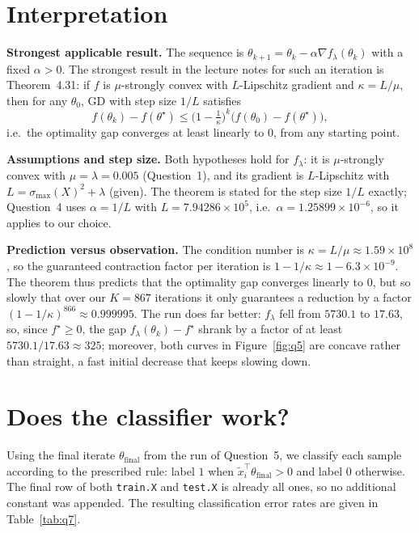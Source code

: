 \documentclass[a4paper,12pt]{article}
\newcommand{\xt}{\tilde{x}}
\begin{document}
\section{Interpretation}\label{sec:q6}
\textbf{Strongest applicable result.} The sequence is $\theta_{k+1} = \theta_k - \alpha \nabla f_\lambda(\theta_k)$ with a fixed $\alpha > 0$. The strongest result in the lecture notes for such an iteration is Theorem~4.31: if $f$ is $\mu$-strongly convex with $L$-Lipschitz gradient and $\kappa = L/\mu$, then for any $\theta_0$, GD with step size $1/L$ satisfies
\[
  f(\theta_k) - f(\theta^\star) \le \Big(1 - \tfrac{1}{\kappa}\Big)^k \big(f(\theta_0) - f(\theta^\star)\big),
\]
i.e.\ the optimality gap converges at least linearly to $0$, from any starting point. 

\textbf{Assumptions and step size.} Both hypotheses hold for $f_\lambda$: it is $\mu$-strongly convex with $\mu = \lambda = 0.005$ (Question~1), and its gradient is $L$-Lipschitz with $L = \sigma_{\max}(X)^2 + \lambda$ (given). The theorem is stated for the step size $1/L$ exactly; Question~4 uses $\alpha = 1/L$ with $L = 7.94286 \times 10^5$, i.e.\ $\alpha = 1.25899 \times 10^{-6}$, so it applies to our choice.

\textbf{Prediction versus observation.} The condition number is $\kappa = L/\mu \approx 1.59 \times 10^8$, so the guaranteed contraction factor per iteration is $1 - 1/\kappa \approx 1 - 6.3 \times 10^{-9}$. The theorem thus predicts that the optimality gap converges linearly to $0$, but so slowly that over our $K = 867$ iterations it only guarantees a reduction by a factor $(1-1/\kappa)^{866} \approx 0.999995$. The run does far better: $f_\lambda$ fell from $5730.1$ to $17.63$, so, since $f^\star \ge 0$, the gap $f_\lambda(\theta_k) - f^\star$ shrank by a factor of at least $5730.1/17.63 \approx 325$; moreover, both curves in Figure~\ref{fig:q5} are concave rather than straight, a fast initial decrease that keeps slowing down.

\section{Does the classifier work?}\label{sec:q7}
Using the final iterate $\theta_{\mathrm{final}}$ from the run of Question~5, we classify each sample according to the prescribed rule: label $1$ when $\xt_i^\top\theta_{\mathrm{final}}>0$ and label $0$ otherwise. The final row of both \texttt{train.X} and \texttt{test.X} is already all ones, so no additional constant was appended.
The resulting classification error rates are given in Table~\ref{tab:q7}.
\end{document}
